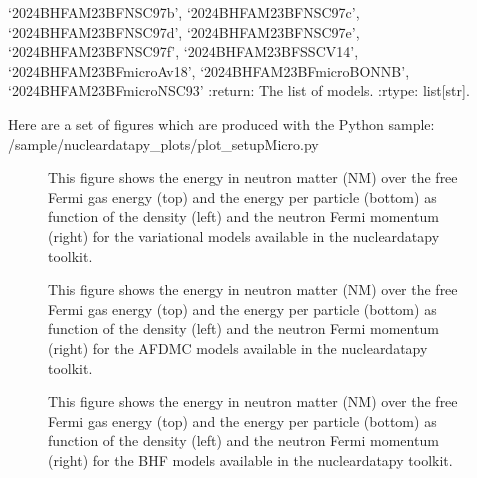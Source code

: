 \documentclass[letterpaper,10pt,english]{sphinxmanual}
\begin{document}
\begin{fulllineitems}
‘2024\sphinxhyphen{}BHF\sphinxhyphen{}AM\sphinxhyphen{}23BF\sphinxhyphen{}NSC97b’, ‘2024\sphinxhyphen{}BHF\sphinxhyphen{}AM\sphinxhyphen{}23BF\sphinxhyphen{}NSC97c’, ‘2024\sphinxhyphen{}BHF\sphinxhyphen{}AM\sphinxhyphen{}23BF\sphinxhyphen{}NSC97d’,     ‘2024\sphinxhyphen{}BHF\sphinxhyphen{}AM\sphinxhyphen{}23BF\sphinxhyphen{}NSC97e’, ‘2024\sphinxhyphen{}BHF\sphinxhyphen{}AM\sphinxhyphen{}23BF\sphinxhyphen{}NSC97f’, ‘2024\sphinxhyphen{}BHF\sphinxhyphen{}AM\sphinxhyphen{}23BF\sphinxhyphen{}SSCV14’,    ‘2024\sphinxhyphen{}BHF\sphinxhyphen{}AM\sphinxhyphen{}23BFmicro\sphinxhyphen{}Av18’, ‘2024\sphinxhyphen{}BHF\sphinxhyphen{}AM\sphinxhyphen{}23BFmicro\sphinxhyphen{}BONNB’, ‘2024\sphinxhyphen{}BHF\sphinxhyphen{}AM\sphinxhyphen{}23BFmicro\sphinxhyphen{}NSC93’
:return: The list of models.
:rtype: list{[}str{]}.

\end{fulllineitems}


\sphinxAtStartPar
Here are a set of figures which are produced with the Python sample: /sample/nucleardatapy\_plots/plot\_setupMicro.py

\begin{figure}[htbp]
\centering
\capstart

\noindent{}
\caption{This figure shows the energy in neutron matter (NM) over the free Fermi gas energy (top) and the energy per particle (bottom) as function of the density (left) and the neutron Fermi momentum (right) for the variational models available in the nucleardatapy toolkit.}\label{\detokenize{source/api/setup_micro_matter:id1}}\end{figure}

\begin{figure}[htbp]
\centering
\capstart

\noindent{}
\caption{This figure shows the energy in neutron matter (NM) over the free Fermi gas energy (top) and the energy per particle (bottom) as function of the density (left) and the neutron Fermi momentum (right) for the AFDMC models available in the nucleardatapy toolkit.}\label{\detokenize{source/api/setup_micro_matter:id2}}\end{figure}

\begin{figure}[htbp]
\centering
\capstart

\noindent{}
\caption{This figure shows the energy in neutron matter (NM) over the free Fermi gas energy (top) and the energy per particle (bottom) as function of the density (left) and the neutron Fermi momentum (right) for the BHF models available in the nucleardatapy toolkit.}\label{\detokenize{source/api/setup_micro_matter:id3}}\end{figure}
\end{document}
